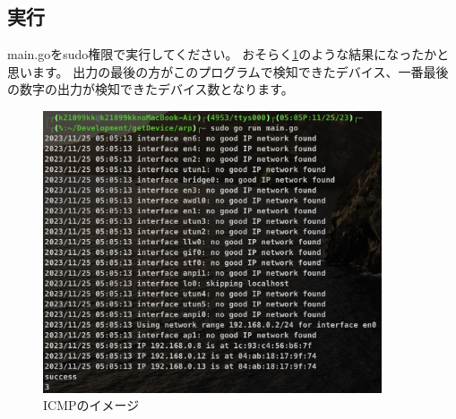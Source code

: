 \subsection{実行}
main.goをsudo権限で実行してください。
おそらく\ref{arp_get}のような結果になったかと思います。
出力の最後の方がこのプログラムで検知できたデバイス、一番最後の数字の出力が検知できたデバイス数となります。
\begin{figure}[H]
    \centering
    \includegraphics[width=10cm]{image/02-Body/arp_get.png}
    \caption{ICMPのイメージ}
    \label{arp_get}
\end{figure}

